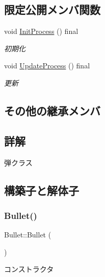 \subsection*{限定公開メンバ関数}
\begin{DoxyCompactItemize}
\item 
void \mbox{\hyperlink{class_bullet_a448c1c566e002d7b51ba6ed5c927bff7}{Init\+Process}} () final
\begin{DoxyCompactList}\small\item\em 初期化 \end{DoxyCompactList}\item 
void \mbox{\hyperlink{class_bullet_aa0867038c9c35e30ee09e21ecdccf281}{Update\+Process}} () final
\begin{DoxyCompactList}\small\item\em 更新 \end{DoxyCompactList}\end{DoxyCompactItemize}
\subsection*{その他の継承メンバ}


\subsection{詳解}
弾クラス 

\subsection{構築子と解体子}
\mbox{\label{class_bullet_acd7befc0bc18907cc1d871d37bbdddeb}} 
\subsubsection{\texorpdfstring{Bullet()}{Bullet()}\hspace{0.1cm}{\footnotesize\ttfamily [1/3]}}
{\footnotesize\ttfamily Bullet\+::\+Bullet (\begin{DoxyParamCaption}{ }\end{DoxyParamCaption})\hspace{0.3cm}{\ttfamily [inline]}}



コンストラクタ 

\mbox{\label{class_bullet_a7e1ed7ba89e019b3d0fd068cfb4f9a6d}} 

